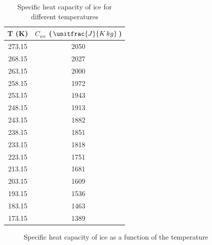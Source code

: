 \begin{table}
	\centering
	\begin{tabular}{|c|c|}
		\hline
		T (K) & $C_{ice}$ ($\unitfrac{J}{K \, kg}$) \\ \hline
		273.15 & 2050 \\ \hline
		268.15 & 2027 \\ \hline
		263.15 & 2000 \\ \hline
		258.15 & 1972 \\ \hline
		253.15 & 1943 \\ \hline
		248.15 & 1913 \\ \hline
		243.15 & 1882 \\ \hline
		238.15 & 1851 \\ \hline
		233.15 & 1818 \\ \hline
		223.15 & 1751 \\ \hline
		213.15 & 1681 \\ \hline
		203.15 & 1609 \\ \hline
		193.15 & 1536 \\ \hline
		183.15 & 1463 \\ \hline
		173.15 & 1389 \\ \hline
	\end{tabular}
	\caption{Specific heat capacity of ice for different temperatures\cite{website:iceDensity}}
	\label{tab:ice_heat_capacity}
\end{table}

\begin{figure}[!b]
	\centering
	\caption{Specific heat capacity of ice as a function of the temperature}
\end{figure}

